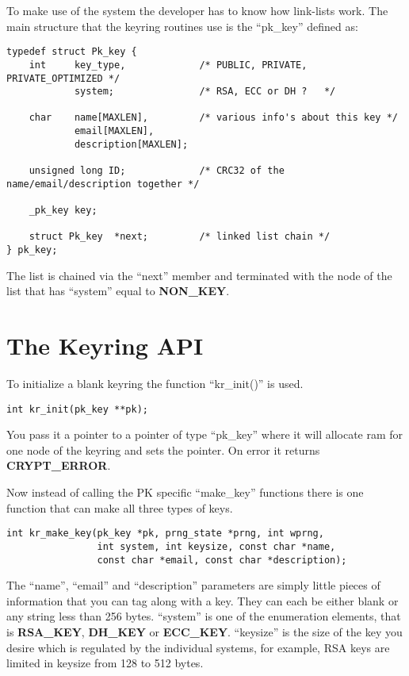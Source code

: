 \documentclass{book}
\begin{document}
To make use of the system the developer has to know how link-lists work.  The main structure that the keyring routines use 
is the ``pk\_key'' defined as:
\begin{small}
\begin{verbatim}
typedef struct Pk_key {
    int     key_type,             /* PUBLIC, PRIVATE, PRIVATE_OPTIMIZED */
            system;               /* RSA, ECC or DH ?   */

    char    name[MAXLEN],         /* various info's about this key */
            email[MAXLEN],
            description[MAXLEN];

    unsigned long ID;             /* CRC32 of the name/email/description together */

    _pk_key key;

    struct Pk_key  *next;         /* linked list chain */
} pk_key;
\end{verbatim}
\end{small}

The list is chained via the ``next'' member and terminated with the node of the list that has ``system'' equal to 
{\bf NON\_KEY}.

\section{The Keyring API}
To initialize a blank keyring the function ``kr\_init()'' is used.
\begin{verbatim}
int kr_init(pk_key **pk);
\end{verbatim}
You pass it a pointer to a pointer of type ``pk\_key'' where it will allocate ram for one node of the keyring and sets the
pointer.  On error it returns {\bf CRYPT\_ERROR}.

Now instead of calling the PK specific ``make\_key'' functions there is one function that can make all three types of keys.
\begin{verbatim}
int kr_make_key(pk_key *pk, prng_state *prng, int wprng, 
                int system, int keysize, const char *name,
                const char *email, const char *description);
\end{verbatim}
The ``name'', ``email'' and ``description'' parameters are simply little pieces of information that you can tag along with a
key.  They can each be either blank or any string less than 256 bytes.  ``system'' is one of the enumeration elements, that
is {\bf RSA\_KEY}, {\bf DH\_KEY} or {\bf ECC\_KEY}.  ``keysize'' is the size of the key you desire which is regulated by
the individual systems, for example, RSA keys are limited in keysize from 128 to 512 bytes.
\end{document}
